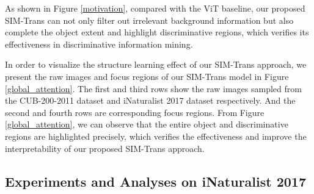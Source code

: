 \documentclass[sigconf, nonacm]{acmart}
\begin{document}
As shown in Figure \ref{motivation}, compared with the ViT baseline, our proposed SIM-Trans can not only filter out irrelevant background information but also complete the object extent and highlight discriminative regions, which verifies its effectiveness in discriminative information mining.

In order to visualize the structure learning effect of our SIM-Trans approach, we present the raw images and focus regions of our SIM-Trans model in Figure \ref{global_attention}. The first and third rows show the raw images sampled from the CUB-200-2011 dataset and iNaturalist 2017 dataset respectively. And the second and fourth rows are corresponding focus regions. From Figure \ref{global_attention}, we can observe that the entire object and discriminative regions are highlighted precisely, which verifies the effectiveness and improve the interpretability of our proposed SIM-Trans approach. 













\subsection{Experiments and Analyses on iNaturalist 2017}
\end{document}
